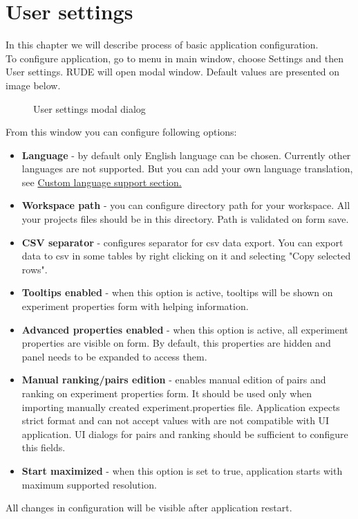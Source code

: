 \section{User settings}\label{section:user-settings}

In this chapter we will describe process of basic application configuration.\\

To configure application, go to menu in main window, choose Settings and then User settings. RUDE will open modal window. Default values are presented on image below.

\begin{figure*}[!ht] 
	\centering
	\caption{User settings modal dialog}
\end{figure*}


From this window you can configure following options:
\begin{itemize}
	\item \textbf{Language} - by default only English language can be chosen. Currently other languages are not supported. But you can add your own language translation, see \hyperref[sub:config-labels]{Custom language support section.}
	\item \textbf{Workspace path} - you can configure directory path for your workspace. All your projects files should be in this directory. Path is validated on form save.
	\item \textbf{CSV separator} - configures separator for csv data export. You can export data to csv in some tables by right clicking on it and selecting "Copy selected rows".
	\item \textbf{Tooltips enabled} - when this option is active, tooltips will be shown on experiment properties form with helping information.
	\item \textbf{Advanced properties enabled} - when this option is active, all experiment properties are visible on form. By default, this properties are hidden and panel needs to be expanded to access them.
	\item \textbf{Manual ranking/pairs edition} - enables manual edition of pairs and ranking on experiment properties form. It should be used only when importing manually created experiment.properties file. Application expects strict format and can not accept values with are not compatible with UI application. UI dialogs for pairs and ranking should be sufficient to configure this fields.
	\item \textbf{Start maximized} - when this option is set to true, application starts with maximum supported resolution.
\end{itemize}

All changes in configuration will be visible after application restart.


\vfill\newpage